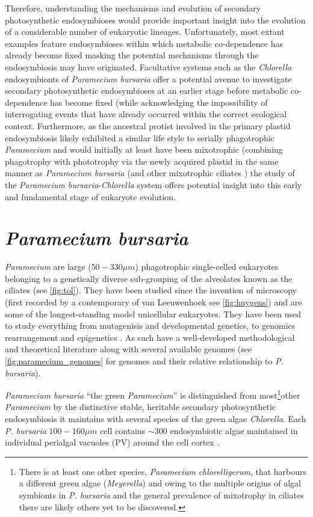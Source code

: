 Therefore, understanding the mechanisms and evolution of secondary photosynthetic endosymbioses would provide important insight into the evolution of a considerable number of eukaryotic lineages.  Unfortunately, most extant examples feature endosymbioses within which metabolic co-dependence has already become fixed
masking the potential mechanisms through the endosymbiosis may have originated.  
Facultative systems such as the \textit{Chlorella} endosymbionts of \textit{Paramecium bursaria} offer a potential avenue to investigate secondary 
photosynthetic endosymbioses at an earlier stage before metabolic co-dependence has become fixed (while acknowledging the impossibility of 
interrogating events that have already occurred within the correct ecological context.
Furthermore, as the ancestral protist involved in the primary plastid endosymbiosis likely exhibited a similar life style to serially phagotrophic
\textit{Paramecium} and would initially at least have been mixotrophic (combining phagotrophy with phototrophy via the newly acquired plastid \citep{Rockwell2014} in the same manner as \textit{Paramecium bursaria} (and other mixotrophic ciliates \citep{Johnson2011}) the study of the \textit{Paramecium bursaria}-\textit{Chlorella} system offers potential insight into this early and fundamental stage of eukaryote evolution.

\section{\textit{Paramecium bursaria}}
\textit{Paramecium} are large (\(50-330\mu m\)) phagotrophic single-celled eukaryotes belonging %
to a genetically diverse \citep{Prescott1994} sub-grouping of the alveolates known as the ciliates (see \ref{fig:tol}).
They have been studied since the invention of microscopy \citep{Gortz2009} (first recorded by a contemporary of van Leeuwenhoek 
see \ref{fig:huygens}) and are some of the longest-standing model unicellular eukaryotes.  They have been used
to study everything from mutagenisis and developmental genetics, to genomics rearrangement and epigenetics \citep{McGrath2014}. 
As such have a well-developed methodological \citep{Sonneborn1970} and theoretical literature along with 
several available genomes (see \ref{fig:paramecium_genomes} for genomes and their relative relationship to \textit{P. bursaria}). %

\textit{Paramecium bursaria} ``the green \textit{Paramecium}'' is distinguished from most\footnote{
    There is at least one other species, \textit{Paramecium chlorelligerum}, that harbours a different green algae (\textit{Meyerella}) \citep{Kreutz2012}
    and owing to the multiple origins of algal symbionts in \textit{P. bursaria} \citep{Hoshina2009} and the general prevalence of mixotrophy
    in ciliates \citep{Johnson2011} there are likely others yet to be discovered.
}other \textit{Paramecium} by the distinctive stable, heritable secondary photosynthetic endosymbiosis it maintains with several species of 
the green algae \textit{Chlorella}.  
Each \textit{P. bursaria} \(100-160\mu m\) \citep{Jennings1939} cell contains \(\sim 300\) endosymbiotic algae maintained in individual perialgal vacuoles (PV) around the cell cortex \citep{Hoshina2009}.

